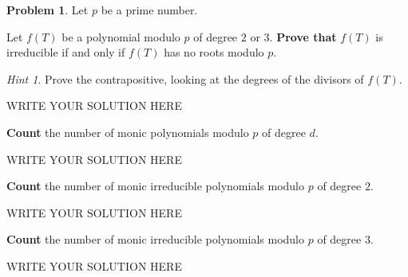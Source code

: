 \documentclass[11pt]{article}
\theoremstyle{plain}
\theoremstyle{definition}
\newtheorem{problem}{Problem}
\theoremstyle{remark}
\newtheorem*{hint}{Hint}
\numberwithin{equation}{problem}
\begin{document}
\begin{problem}
	Let $p$ be a prime number. 
	\begin{listinprob}
		\item Let $f(T)$ be a polynomial modulo $p$ of degree $2$ or $3$. \textbf{Prove that} $f(T)$ is irreducible if and only if $f(T)$ has no roots modulo $p$.
		\begin{hint}
			Prove the contrapositive, looking at the degrees of the divisors of $f(T)$.
		\end{hint}
\begin{solution} %
WRITE YOUR SOLUTION HERE
\end{solution}\clearpage %
		\item \textbf{Count} the number of monic polynomials modulo $p$ of degree $d$.
\begin{solution} %
WRITE YOUR SOLUTION HERE
\end{solution}\clearpage %
		\item \textbf{Count} the number of monic irreducible polynomials modulo $p$ of degree $2$.
\begin{solution} %
WRITE YOUR SOLUTION HERE
\end{solution}\clearpage %
		\item \textbf{Count} the number of monic irreducible polynomials modulo $p$ of degree $3$.
\begin{solution} %
WRITE YOUR SOLUTION HERE
\end{solution}\clearpage %
	\end{listinprob}	
\end{problem}
\end{document}
